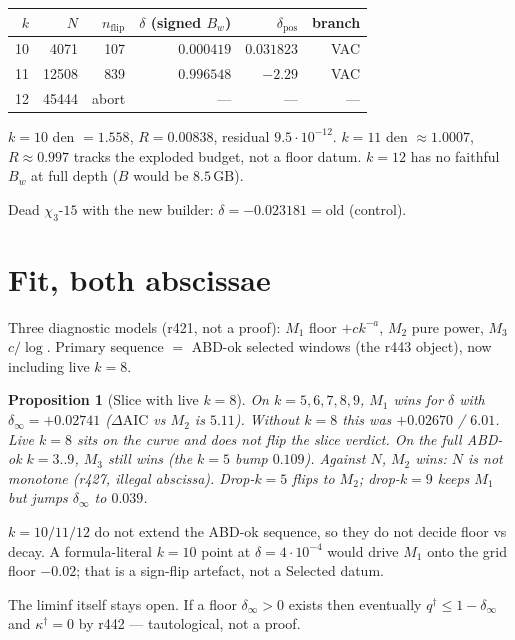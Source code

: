 \documentclass[11pt]{article}
\newtheorem{prop}{Proposition}
\newcommand{\qd}{q^{\dagger}}
\newcommand{\kapd}{\kappa^{\dagger}}
\begin{document}
\begin{center}
\small
\begin{tabular}{rrrrrr}
\toprule
$k$ & $N$ & $n_{\mathrm{flip}}$ & $\delta$ (signed $B_w$) & $\delta_{\mathrm{pos}}$ & branch \\
\midrule
10 & 4071 & 107 & $0.000419$ & $0.031823$ & VAC \\
11 & 12508 & 839 & $0.996548$ & $-2.29$ & VAC \\
12 & 45444 & abort & --- & --- & --- \\
\bottomrule
\end{tabular}
\end{center}

$k=10$ den $=1.558$, $R=0.00838$, residual
$9.5\cdot 10^{-12}$.
$k=11$ den $\approx 1.0007$, $R\approx 0.997$
tracks the exploded budget, not a floor datum.
$k=12$ has no faithful $B_w$ at full depth
($B$ would be $8.5\,\mathrm{GB}$).

Dead $\chi_3$-$15$ with the new builder:
$\delta=-0.023181=\mathrm{old}$ (control).

\section{Fit, both abscissae}\label{sec:aic}

Three diagnostic models (r421, not a proof):
$M_1$ floor $+ck^{-a}$, $M_2$ pure power, $M_3$
$c/\log$.
Primary sequence $=$ ABD-ok selected windows
(the r443 object), now including live $k=8$.

\begin{prop}[Slice with live $k=8$]\label{prop:aic}
On $k=5,6,7,8,9$, $M_1$ wins for $\delta$ with
$\delta_{\infty}=+0.02741$
($\Delta\mathrm{AIC}$ vs $M_2$ is $5.11$).
Without $k=8$ this was $+0.02670$ / $6.01$.
Live $k=8$ sits on the curve and does not flip
the slice verdict.
On the full ABD-ok $k=3..9$, $M_3$ still wins
(the $k=5$ bump $0.109$).
Against $N$, $M_2$ wins: $N$ is not monotone
(r427, illegal abscissa).
Drop-$k=5$ flips to $M_2$; drop-$k=9$ keeps $M_1$
but jumps $\delta_{\infty}$ to $0.039$.
\end{prop}

$k=10/11/12$ do not extend the ABD-ok sequence,
so they do not decide floor vs decay.
A formula-literal $k=10$ point at $\delta=4\cdot 10^{-4}$
would drive $M_1$ onto the grid floor $-0.02$;
that is a sign-flip artefact, not a Selected datum.

The liminf itself stays open.
If a floor $\delta_{\infty}>0$ exists then
eventually $\qd\le 1-\delta_{\infty}$ and
$\kapd=0$ by r442 --- tautological, not a proof.
\end{document}
